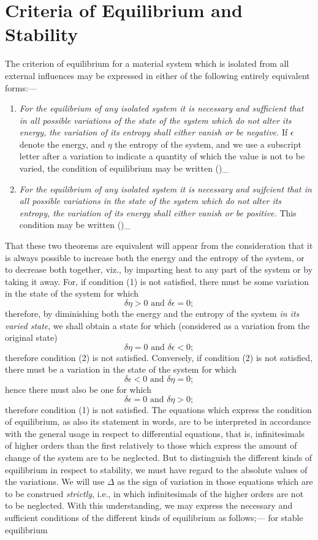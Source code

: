 \documentclass[12pt]{memoir}
\begin{document}
\section{Criteria of Equilibrium and Stability}
The criterion of equilibrium for a material system which is isolated from all external influences may be expressed in either of the following entirely equivalent forms:---
\begin{enumerate}
\item \textit{For the equilibrium of any isolated system it is necessary and sufficient that in all possible variations of the state of the system which do not alter its energy, the variation of its entropy shall either vanish or be negative.} If $\epsilon$ denote the energy, and $\eta$ the entropy of the system, and we use a subscript letter after a variation to indicate a quantity of which the value is not to be varied, the condition of equilibrium may be written
\eqs
 (\delta \eta)_{\epsilon}   \label{1}
\eqe
\item \textit{For the equilibrium of any isolated system it is necessary and sujfcient that in all possible variations in the state of the system which do not alter its entropy, the variation of its energy shall either vanish or be positive.}  This condition may be written
\eqs
(\delta \epsilon)_\eta {} \label{2}
\eqe
\end{enumerate}
That these two theorems are equivalent will appear from the consideration that it is always possible to increase both the energy and the entropy of the system, or to decrease both together, viz., by imparting heat to any part of the system or by taking it away. For, if condition (1) is not satisfied, there must be some variation in the state of the system for which
$$\delta \eta > 0 \text{  and }  \delta \epsilon = 0;$$
therefore, by diminishing both the energy and the entropy of the system \textit{in its varied state}, we shall obtain a state for which (considered as a variation from the original state)
$$\delta \eta = 0 \text{  and }  \delta \epsilon <0;$$
therefore condition (2) is not satisfied. Conversely, if condition (2) is not satisfied, there must be a variation in the state of the system for which
$$\delta \epsilon < 0 \text{  and }  \delta \eta =0;$$
hence there must also be one for which
$$\delta \epsilon = 0 \text{  and }  \delta \eta >0;$$
therefore condition (1) is not satisfied.
The equations which express the condition of equilibrium, as also its statement in words, are to be interpreted in accordance with the general usage in respect to differential equations, that is, infinitesimals of higher orders than the first relatively to those which express the amount of change of the system are to be neglected. But to distinguish the different kinds of equilibrium in respect to stability, we must have regard to the absolute values of the variations. We will use $\Delta$ as the sign of variation in those equations which are to be construed \emph{strictly}, i.e., in which infinitesimals of the higher orders are not to be neglected. With this understanding, we may express the necessary and sufficient conditions of the different kinds of equilibrium as follows;--- for stable equilibrium
\end{document}
